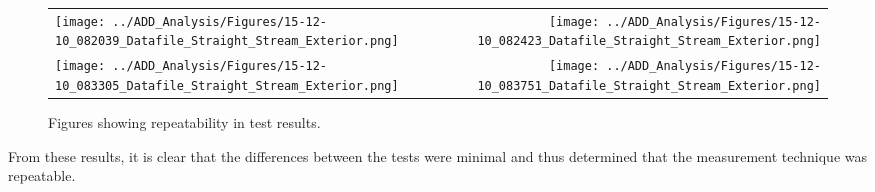 \documentclass{article}
\begin{document}
\clearpage 

\begin{figure}[ht]
\begin{tabular*}{\textwidth}{lr}
\texttt{[image: ../ADD\_Analysis/Figures/15-12-10\_082039\_Datafile\_Straight\_Stream\_Exterior.png]} &
\texttt{[image: ../ADD\_Analysis/Figures/15-12-10\_082423\_Datafile\_Straight\_Stream\_Exterior.png]} \\
\texttt{[image: ../ADD\_Analysis/Figures/15-12-10\_083305\_Datafile\_Straight\_Stream\_Exterior.png]} &
\texttt{[image: ../ADD\_Analysis/Figures/15-12-10\_083751\_Datafile\_Straight\_Stream\_Exterior.png]} \\
\end{tabular*}
\caption{Figures showing repeatability in test results.}
\label{fig:Repeatability_Testing}
\end{figure}

\vspace*{\baselineskip}

From these results, it is clear that the differences between the tests were minimal and thus determined that the measurement technique was repeatable.

\clearpage


\end{document}
